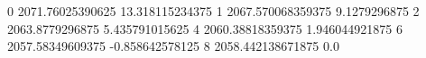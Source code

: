 0 2071.76025390625 13.318115234375
1 2067.570068359375 9.1279296875
2 2063.8779296875 5.435791015625
4 2060.38818359375 1.946044921875
6 2057.58349609375 -0.858642578125
8 2058.442138671875 0.0
